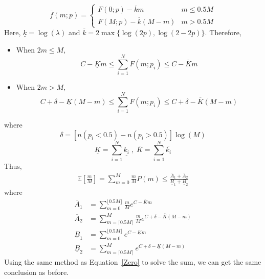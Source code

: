 \documentclass{article}
\begin{document}
\begin{equation*}
\overline{f}(m;p)= \left\{
    \begin{array}{cl}
    F(0;p)-\overline{k} m & m\leq 0.5M\\
    F(M;p)-\overline{k}(M-m) & m>0.5M
    \end{array}\right.
\end{equation*}
Here, $\underline{k}=\log(\lambda)$ and $\overline{k}=2\max\{\log(2p),\log(2-2p)\}$.
Therefore,
\begin{itemize}
\item When $2m\leq M$,
\begin{equation}
C-\underline{K}m\leq \sum_{i=1}^{N}F(m;p_i)\leq C-\overline{K}m
\end{equation}
\item When $2m>M$,
\begin{equation}
C+\delta-\underline{K}(M-m)\leq \sum_{i=1}^{N}F(m;p_i)\leq C+\delta-\overline{K}(M-m)
\end{equation}
\end{itemize}
where $$\delta=[n(p_i<0.5)-n(p_i>0.5)]\log(M)$$
$$\underline{K}=\sum_{i=1}^{N}\underline{k_i}\;,\;\overline{K}=\sum_{i=1}^{N}\overline{k_i}$$
Thus,
\begin{equation}
\begin{split}
\mathbb{E}\left[\frac{m}{M}\right]=\sum_{m=0}^{M}\frac{m}{M}P(m)\leq\frac{\overline{A}_1+\overline{A}_2}{\underline{B}_1+\underline{B}_2}
\end{split}
\end{equation}
where
\begin{equation*}
\begin{split}
\overline{A}_1&= \sum_{m=0}^{\lfloor0.5M\rfloor}\frac{m}{M} e^{C-\overline{K}m}\\
\overline{A}_2&=\sum_{m=\lceil0.5M\rceil}^{M}\frac{m}{M} e^{C+\delta-\overline{K}(M-m)}\\
\underline{B}_1&=\sum_{m=0}^{\lfloor0.5M\rfloor}e^{C-\underline{K}m}\\
\underline{B}_2&= \sum_{m=\lceil0.5M\rceil}^{M}e^{C+\delta-\underline{K}(M-m)}
\end{split}
\end{equation*}
Using the same method as Equation~\ref{Zero} to solve the sum, we can get the same conclusion as before.


\end{document}
